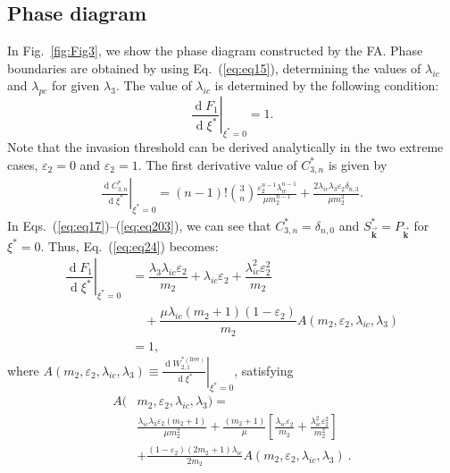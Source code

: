 \documentclass[aps,pre,twocolumn,nofootinbib,superscriptaddress,showpacs,showkeys]{revtex4-1}
\begin{document}
    
\subsection{Phase diagram}
In Fig.~\ref{fig:Fig3}, we show the phase diagram 
constructed by the FA. Phase boundaries are obtained by using Eq.~(\ref{eq:eq15}), determining the values of $\lambda_{ic}$ and $\lambda_{pc}$ for given $\lambda_3$.   
The value of $\lambda_{ic}$ is determined by the following condition:
\begin{equation}
    \left.{\frac{\operatorname{d}\!F_1}{\operatorname{d}\!\xi^{*}}}\right|_{\xi^{*}=0}=1.
    \label{eq:eq24}
\end{equation}
Note that the invasion threshold can be derived analytically in the two extreme cases, $\varepsilon_2=0$ and $\varepsilon_2=1$.  
The first derivative value of $C^{*}_{3,n}$ is given by
\begin{align}
    \left.{\frac{\operatorname{d}\!C^{*}_{3,n}}{\operatorname{d}\!\xi^{*}}}\right|_{\xi^{*}=0}=
    (n-1)!{3 \choose n}\frac{\varepsilon_2^{n-1}\lambda_{ic}^{n-1}}{\mu m_2^{n-1}}+\frac{2\lambda_{ic}\lambda_3\varepsilon_2\delta_{n,3}}{\mu m_2^2}.
\label{eq:eq26}
\end{align} 
In Eqs.~(\ref{eq:eq17})--(\ref{eq:eq203}), we can see that $C^*_{3,n}=\delta_{n,0}$ and $S^{*}_{\vec{\mathbf{k}}}=P_{\vec{\mathbf{k}}}$ for $\xi^*=0$. 
Thus, Eq.~(\ref{eq:eq24}) becomes:
\begin{align}
\left.{\dfrac{\operatorname{d}\!F_1}{\operatorname{d}\!\xi^{*}}}\right|_{\xi^*=0}&=
\dfrac{\lambda_3\lambda_{ic}\varepsilon_2}{m_2}
+\lambda_{ic}\varepsilon_2+\dfrac{\lambda_{ic}^2 \varepsilon_2^2}{m_2}\nonumber
\\
&\quad+\dfrac{\mu\lambda_{ic}(m_2+1)(1-\varepsilon_2)}{m_2}A(m_2,\varepsilon_2,\lambda_{ic},\lambda_{3})\nonumber
\\
&=1,
\label{eq:eq27}
\end{align}
where $A(m_2,\varepsilon_2,\lambda_{ic},\lambda_3)\equiv \left.{\frac{\operatorname{d}\!W^{*(\mathrm{free})}_{2,1}}{\operatorname{d}\!\xi^{*}}}\right|_{\xi^*=0}$, satisfying
\begin{align}
A(& m_2,\varepsilon_2,\lambda_{ic},\lambda_{3})=\nonumber \\
&\frac{\lambda_{ic}\lambda_3 \varepsilon_2(m_2+1)}{\mu m^2_2}
+\frac{(m_2+1)}{\mu}\left[\frac{\lambda_{ic}\varepsilon_2}{m_2} 
+\frac{\lambda^2_{ic}\varepsilon^2_2}{m^2_2}\right] \nonumber\\
&+\frac{(1-\varepsilon_2)(2m_2+1)\lambda_{ic}}{2m_2}A(m_2,\varepsilon_2,\lambda_{ic},\lambda_3)~.
\label{eq:eqA}
\end{align}
\end{document}
